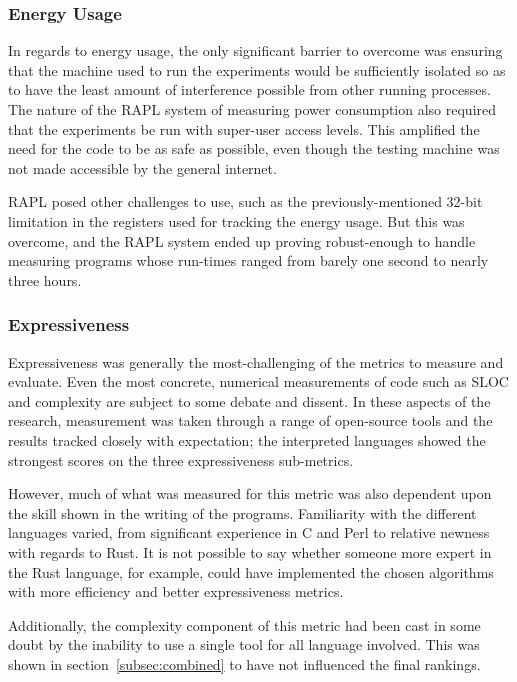 \subsubsection{Energy Usage}

In regards to energy usage, the only significant barrier to overcome was ensuring that the machine used to run the experiments would be sufficiently isolated so as to have the least amount of interference possible from other running processes. The nature of the RAPL system of measuring power consumption also required that the experiments be run with super-user access levels. This amplified the need for the code to be as safe as possible, even though the testing machine was not made accessible by the general internet.

RAPL posed other challenges to use, such as the previously-mentioned 32-bit limitation in the registers used for tracking the energy usage. But this was overcome, and the RAPL system ended up proving robust-enough to handle measuring programs whose run-times ranged from barely one second to nearly three hours.

\subsubsection{Expressiveness}

Expressiveness was generally the most-challenging of the metrics to measure and evaluate. Even the most concrete, numerical measurements of code such as SLOC and complexity are subject to some debate and dissent. In these aspects of the research, measurement was taken through a range of open-source tools and the results tracked closely with expectation; the interpreted languages showed the strongest scores on the three expressiveness sub-metrics.

However, much of what was measured for this metric was also dependent upon the skill shown in the writing of the programs. Familiarity with the different languages varied, from significant experience in C and Perl to relative newness with regards to Rust. It is not possible to say whether someone more expert in the Rust language, for example, could have implemented the chosen algorithms with more efficiency and better expressiveness metrics.

Additionally, the complexity component of this metric had been cast in some doubt by the inability to use a single tool for all language involved. This was shown in section~\ref{subsec:combined} to have not influenced the final rankings.

